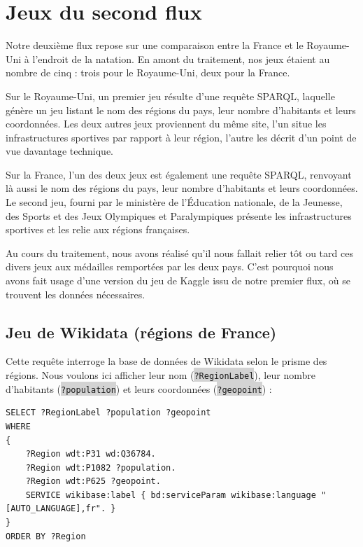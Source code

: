 \documentclass[hidelinks, 12pt]{report}
\newcommand{\code}[1]{\colorbox{LightGray}{\texttt{#1}}}
\begin{document}
\section{Jeux du second flux}

Notre deuxième flux repose sur une comparaison entre la France et le Royaume-Uni à l'endroit de la natation. En amont du traitement, nos jeux étaient au nombre de cinq : trois pour le Royaume-Uni, deux pour la France.

Sur le Royaume-Uni, un premier jeu résulte d'une requête SPARQL, laquelle génère un jeu listant le nom des régions du pays, leur nombre d'habitants et leurs coordonnées\autocite{wikiqueryeng}. Les deux autres jeux proviennent du même site\autocite{ru}, l'un situe les infrastructures sportives par rapport à leur région, l'autre les décrit d'un point de vue davantage technique.

Sur la France, l'un des deux jeux est également une requête SPARQL, renvoyant là aussi le nom des régions du pays, leur nombre d'habitants et leurs coordonnées\autocite{wikiqueryfr}. Le second jeu, fourni par le ministère de l'Éducation nationale, de la Jeunesse, des Sports et des Jeux Olympiques et Paralympiques\autocite{ministere} présente les infrastructures sportives et les relie aux régions françaises.

Au cours du traitement, nous avons réalisé qu'il nous fallait relier tôt ou tard ces divers jeux aux médailles remportées par les deux pays. C'est pourquoi nous avons fait usage d'une version du jeu de Kaggle issu de notre premier flux, où se trouvent les données nécessaires.





%





\subsection{Jeu de Wikidata (régions de France)}

\label{queryfr}Cette requête interroge la base de données de Wikidata selon le prisme des régions. Nous voulons ici afficher leur nom (\code{?RegionLabel}), leur nombre d'habitants (\code{?population}) et leurs coordonnées (\code{?geopoint}) :

\begin{lstlisting}[language=SPARQL]
SELECT ?RegionLabel ?population ?geopoint
WHERE 
{
	?Region wdt:P31 wd:Q36784.
	?Region wdt:P1082 ?population.
	?Region wdt:P625 ?geopoint.
	SERVICE wikibase:label { bd:serviceParam wikibase:language "[AUTO_LANGUAGE],fr". }
}
ORDER BY ?Region
\end{lstlisting}
\end{document}
